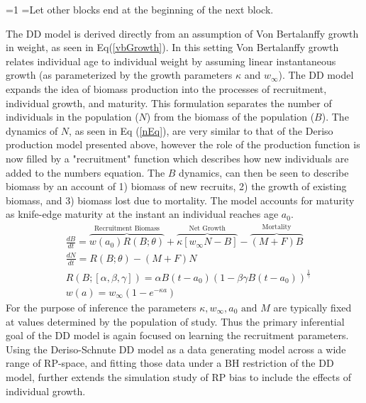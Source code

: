 \documentclass[12pt]{article}
\newcounter{alphasect}
\def\alphainsection{0}
\newenvironment{alphasection}{%
  \ifnum\alphainsection=1%
    \errhelp={Let other blocks end at the beginning of the next block.}
    \errmessage{Nested Alpha section not allowed}
  \fi%
  \setcounter{alphasect}{0}
  \def\alphainsection{1}
}{%
  \setcounter{alphasect}{0}
  \def\alphainsection{0}
}%
\begin{document}
\begin{alphasection}
%
The DD model is derived directly from an assumption of Von Bertalanffy growth  %
in weight, as seen in Eq(\ref{vbGrowth}). In this setting Von Bertalanffy 
growth relates individual age to individual weight by assuming linear 
instantaneous growth (as parameterized by the growth parameters $\kappa$ and 
$w_\infty$). The DD model expands the idea of biomass production into the 
processes of recruitment, individual growth, and maturity. This formulation 
separates the number of individuals in the population ($N$) from the biomass 
of the population ($B$). The dynamics of $N$, as seen in Eq (\ref{nEq}), are 
very similar to that of the Deriso production model presented above, however 
the role of the production function is now filled by a "recruitment" function 
which describes how new individuals are added to the numbers equation. The $B$ dynamics, 
can then be seen to describe biomass by an account of 1) biomass of new 
recruits, 2) the growth of existing biomass, and 3) biomass lost due to 
mortality. The model accounts for maturity as knife-edge maturity at the 
instant an individual reaches age $a_0$.  
%
\begin{align}%
&\frac{dB}{dt} = \overbrace{w(a_0)R(B;\theta)}^\text{Recruitment Biomass} + \overbrace{\kappa \left[w_\infty N-B\right]}^\text{Net Growth} - \overbrace{(M+F)B}^\text{Mortality} \label{bEq}\\
&\frac{dN}{dt} = R(B;\theta) - (M+F)N \label{nEq}\\
&R(B;[\alpha, \beta, \gamma]) = \alpha B(t-a_0)(1-\beta\gamma B(t-a_0))^{\frac{1}{\gamma}} \label{srr}\\
&w(a) = w_\infty(1-e^{-\kappa a}) \label{vbGrowth}
\end{align}
%
\indent
For the purpose of inference the parameters $\kappa, w_\infty, a_0 \text{ and } M$ are 
typically fixed at values determined by the population of study. Thus the 
primary inferential goal of the DD model is again focused on learning the 
recruitment parameters. Using the Deriso-Schnute DD model as a data generating 
model across a wide range of RP-space, and fitting those data under a BH 
restriction of the DD model, further extends the simulation study of RP bias 
to include the effects of individual growth.


\end{alphasection}
\end{document}

